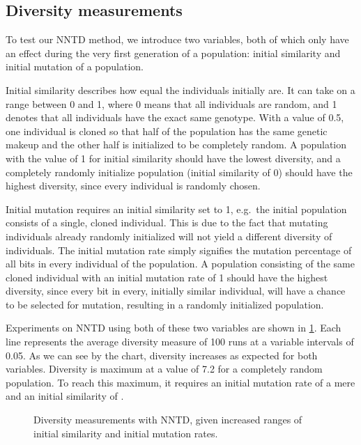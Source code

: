 \subsection{Diversity measurements}
To test our NNTD method, we introduce two variables, both of which only have an effect during the very first generation of a population: initial similarity and initial mutation of a population. 

Initial similarity describes how equal the individuals initially are. It can take on a range between \num{0} and \num{1}, where \num{0} means that all individuals are random, and \num{1} denotes that  all individuals have the exact same genotype. With a value of \num{0.5}, one individual is cloned so that half of the population has the same genetic makeup and the other half is initialized to be completely random. A population with the value of \num{1} for initial similarity should have the lowest diversity, and a completely randomly initialize population (initial similarity of \num{0}) should have the highest diversity, since every individual is randomly chosen.

Initial mutation requires an initial similarity set to \num{1}, e.g.\ the initial population consists of a single, cloned individual. This is due to the fact that mutating individuals already randomly initialized will not yield a different diversity of individuals. The initial mutation rate simply signifies the mutation percentage of all bits in every individual of the population. A population consisting of the same cloned individual with an initial mutation rate of \num{1} should have the highest diversity, since every bit in every, initially similar individual, will have a  chance to be selected for mutation, resulting in a randomly initialized population.

Experiments on NNTD using both of these two variables are shown in \cref{fig:initial-mutation-similarity}. Each line represents the average diversity measure of \num{100} runs at a variable intervals of \num{0.05}. As we can see by the chart, diversity increases as expected for both variables. Diversity is maximum at a value of \num{7.2} for a completely random population. To reach this maximum, it requires an initial mutation rate of a mere  and an initial similarity of .

\begin{figure}[htpb]
  \centering
  \caption{Diversity measurements with NNTD, given increased ranges of initial similarity and initial mutation rates.}\label{fig:initial-mutation-similarity}
\end{figure}
